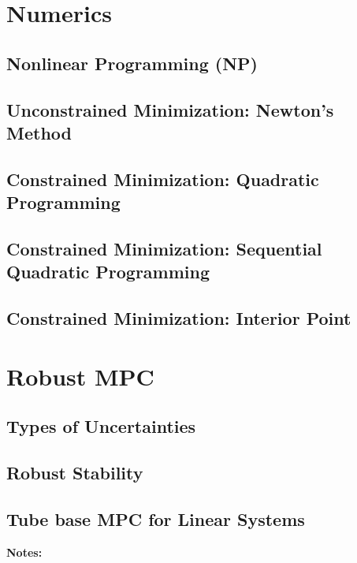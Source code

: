 \documentclass[english]{latex4ei/latex4ei_sheet}
\begin{document}
\section{Numerics}
\begin{sectionbox}

\subsection{Nonlinear Programming (NP)}

\subsection{Unconstrained Minimization: Newton's Method}

\subsection{Constrained Minimization: Quadratic Programming}

\subsection{Constrained Minimization: Sequential Quadratic Programming}

\subsection{Constrained Minimization: Interior Point}

\end{sectionbox}


\section{Robust MPC}
\begin{sectionbox}

\subsection{Types of Uncertainties}

\subsection{Robust Stability}

\subsection{Tube base MPC for Linear Systems}

\end{sectionbox}
\textbf{Notes:}

\end{document}

